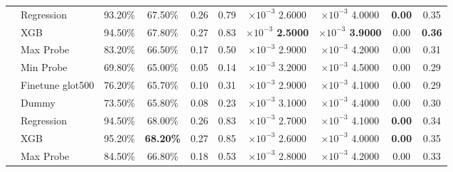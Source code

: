 \begin{tabular}{ll||cccccccc}
	                         & Regression       & 93.20\%                       & 67.50\%           & 0.26           & \multicolumn{1}{c|}{0.79}           & $\times 10^{-3}$ 2.6000           & $\times 10^{-3}$ 4.0000           & \bfseries 0.00 & 0.35          \\
	                         & XGB              & 94.50\%                       & 67.80\%           & 0.27           & \multicolumn{1}{c|}{0.83}           & \bfseries $\times 10^{-3}$ 2.5000 & \bfseries $\times 10^{-3}$ 3.9000 & 0.00           & \bfseries 0.36\\
	                         & Max Probe        & 83.20\%                       & 66.50\%           & 0.17           & \multicolumn{1}{c|}{0.50}           & $\times 10^{-3}$ 2.9000           & $\times 10^{-3}$ 4.2000           & 0.00           & 0.31          \\
	                         & Min Probe        & 69.80\%                       & 65.00\%           & 0.05           & \multicolumn{1}{c|}{0.14}           & $\times 10^{-3}$ 3.2000           & $\times 10^{-3}$ 4.5000           & 0.00           & 0.29          \\
	                         & Finetune glot500 & 76.20\%                       & 65.70\%           & 0.10           & \multicolumn{1}{c|}{0.31}           & $\times 10^{-3}$ 2.9000           & $\times 10^{-3}$ 4.1000           & 0.00           & 0.29          \\\hhline{*{10}{-}}
	\multirow{6}{*}{French}  & Dummy            & 73.50\%                       & 65.80\%           & 0.08           & \multicolumn{1}{c|}{0.23}           & $\times 10^{-3}$ 3.1000           & $\times 10^{-3}$ 4.4000           & 0.00           & 0.30          \\
	                         & Regression       & 94.50\%                       & 68.00\%           & 0.26           & \multicolumn{1}{c|}{0.83}           & $\times 10^{-3}$ 2.7000           & $\times 10^{-3}$ 4.1000           & \bfseries 0.00 & 0.34          \\
	                         & XGB              & 95.20\%                       & \bfseries 68.20\% & 0.27           & \multicolumn{1}{c|}{0.85}           & $\times 10^{-3}$ 2.6000           & $\times 10^{-3}$ 4.0000           & \bfseries 0.00 & 0.35          \\
	                         & Max Probe        & 84.50\%                       & 66.80\%           & 0.18           & \multicolumn{1}{c|}{0.53}           & $\times 10^{-3}$ 2.8000           & $\times 10^{-3}$ 4.2000           & 0.00           & 0.33          \\

\end{tabular}
